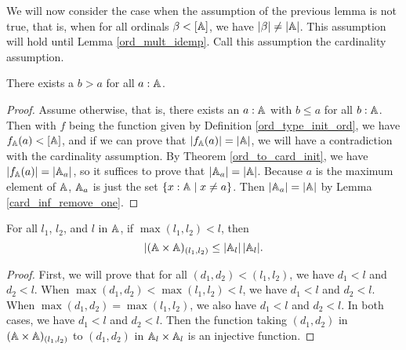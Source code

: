 \documentclass[../../math.tex]{subfiles}
\begin{document}
We will now consider the case when the assumption of the previous lemma is not
true, that is, when for all ordinals $\beta < [\mathbb{A}]$, we have $|\beta| \neq
|\mathbb{A}|$.  This assumption will hold until Lemma \ref{ord_mult_idemp}.  Call this
assumption the cardinality assumption.

\begin{lemma} \label{card_mult_idemp_gt_ex}
    There exists a $b > a$ for all $a : \mathbb{A}$.
\end{lemma}
\begin{proof}
    Assume otherwise, that is, there exists an $a : \mathbb{A}$ with $b \leq a$ for all
    $b : \mathbb{A}$.  Then with $f$ being the function given by Definition
    \ref{ord_type_init_ord}, we have $f_{\mathbb{A}}(a) < [\mathbb{A}]$, and if we can prove that
    $|f_{\mathbb{A}}(a)| = |\mathbb{A}|$, we will have a contradiction with the cardinality
    assumption.  By Theorem \ref{ord_to_card_init}, we have $|f_{\mathbb{A}}(a)| =
    |\mathbb{A}_a|$, so it suffices to prove that $|\mathbb{A}_a| = |\mathbb{A}|$.  Because $a$ is the
    maximum element of $\mathbb{A}$, $\mathbb{A}_a$ is just the set $\{x : \mathbb{A} \mid x \neq a\}$.
    Then $|\mathbb{A}_a| = |\mathbb{A}|$ by Lemma \ref{card_inf_remove_one}.
\end{proof}

\begin{lemma} \label{card_mult_idemp_l_leq}
    For all $l_1$, $l_2$, and $l$ in $\mathbb{A}$, if $\max(l_1, l_2) < l$, then
    \[
        |(\mathbb{A} \times \mathbb{A})_{(l_1, l_2)} \leq
        |\mathbb{A}_l| \, |\mathbb{A}_l|.
    \]
\end{lemma}
\begin{proof}
    First, we will prove that for all $(d_1, d_2) < (l_1, l_2)$, we have $d_1 <
    l$ and $d_2 < l$.  When $\max(d_1, d_2) < \max(l_1, l_2) < l$, we have $d_1
    < l$ and $d_2 < l$.  When $\max(d_1, d_2) = \max(l_1, l_2)$, we also have
    $d_1 < l$ and $d_2 < l$.  In both cases, we have $d_1 < l$ and $d_2 < l$.
    Then the function taking $(d_1, d_2)$ in $(\mathbb{A} \times \mathbb{A})_{(l_1, l_2)}$ to
    $(d_1, d_2)$ in $\mathbb{A}_l \times \mathbb{A}_l$ is an injective function.
\end{proof}
\end{document}
